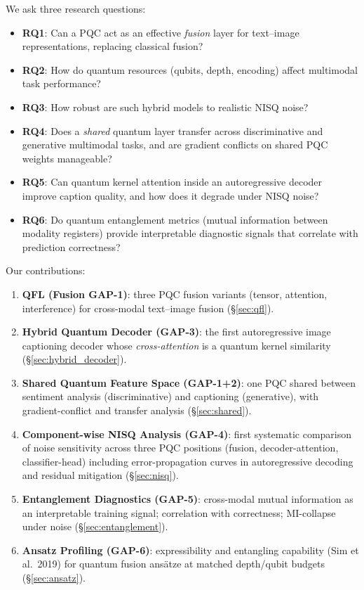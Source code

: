 \documentclass[11pt]{article}
\begin{document}
We ask three research questions:
\begin{itemize}
  \item \textbf{RQ1}: Can a PQC act as an effective \emph{fusion} layer for
        text--image representations, replacing classical fusion?
  \item \textbf{RQ2}: How do quantum resources (qubits, depth, encoding) affect
        multimodal task performance?
  \item \textbf{RQ3}: How robust are such hybrid models to realistic NISQ noise?
  \item \textbf{RQ4}: Does a \emph{shared} quantum layer transfer across
        discriminative and generative multimodal tasks, and are gradient conflicts
        on shared PQC weights manageable?
  \item \textbf{RQ5}: Can quantum kernel attention inside an autoregressive
        decoder improve caption quality, and how does it degrade under NISQ noise?
  \item \textbf{RQ6}: Do quantum entanglement metrics (mutual information between
        modality registers) provide interpretable diagnostic signals that
        correlate with prediction correctness?
\end{itemize}

Our contributions:
\begin{enumerate}
  \item \textbf{QFL (Fusion GAP-1)}: three PQC fusion variants (tensor,
        attention, interference) for cross-modal text--image fusion
        (\S\ref{sec:qfl}).
  \item \textbf{Hybrid Quantum Decoder (GAP-3)}: the first autoregressive image
        captioning decoder whose \emph{cross-attention} is a quantum kernel
        similarity (\S\ref{sec:hybrid_decoder}).
  \item \textbf{Shared Quantum Feature Space (GAP-1+2)}: one PQC shared between
        sentiment analysis (discriminative) and captioning (generative), with
        gradient-conflict and transfer analysis (\S\ref{sec:shared}).
  \item \textbf{Component-wise NISQ Analysis (GAP-4)}: first systematic
        comparison of noise sensitivity across three PQC positions (fusion,
        decoder-attention, classifier-head) including error-propagation curves
        in autoregressive decoding and residual mitigation (\S\ref{sec:nisq}).
  \item \textbf{Entanglement Diagnostics (GAP-5)}: cross-modal mutual
        information as an interpretable training signal; correlation with
        correctness; MI-collapse under noise (\S\ref{sec:entanglement}).
  \item \textbf{Ansatz Profiling (GAP-6)}: expressibility and entangling
        capability (Sim et al.\ 2019) for quantum fusion ans\"atze at matched
        depth/qubit budgets (\S\ref{sec:ansatz}).
\end{enumerate}
\end{document}
